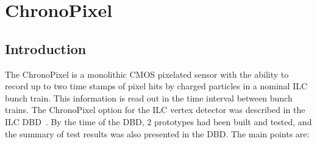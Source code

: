 \section{ChronoPixel}

\subsection{Introduction}
The ChronoPixel is a monolithic CMOS pixelated sensor with the ability to record up to two time stamps of pixel hits by charged particles in a nominal ILC bunch train. This information is read out in the time interval between bunch trains. The ChronoPixel option for the ILC vertex detector was described in the ILC DBD~\cite{2011arXiv1109.2811B}. By the time of the DBD, 2 prototypes had been built and tested, and the summary of test results was also presented in the DBD. The main points are:
